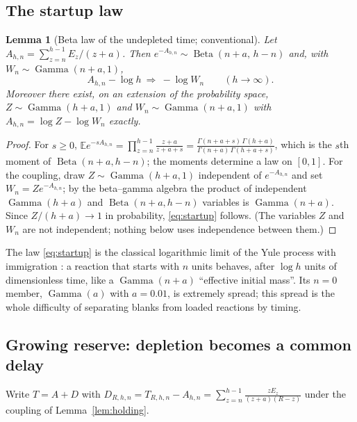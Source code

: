 \documentclass[11pt,a4paper]{article}
\theoremstyle{plain}
\newtheorem{lemma}[theorem]{Lemma}
\theoremstyle{definition}
\theoremstyle{remark}
\newcommand{\E}{\mathbb E}
\DeclareMathOperator{\Gam}{Gamma}
\DeclareMathOperator{\Bet}{Beta}
\begin{document}
\subsection{The startup law}
\begin{lemma}[Beta law of the undepleted time; conventional]\label{lem:beta}
Let $A_{h,n}=\sum_{z=n}^{h-1}E_z/(z+a)$. Then $e^{-A_{h,n}}\sim\Bet(n+a,\,h-n)$ and, with $W_n\sim\Gam(n+a,1)$,
\begin{equation}\label{eq:startup}
A_{h,n}-\log h\ \Rightarrow\ -\log W_n\qquad(h\to\infty).
\end{equation}
Moreover there exist, on an extension of the probability space, $Z\sim\Gam(h+a,1)$ and $W_n\sim\Gam(n+a,1)$ with $A_{h,n}=\log Z-\log W_n$ exactly.
\end{lemma}
\begin{proof}
For $s\ge0$, $\E e^{-sA_{h,n}}=\prod_{z=n}^{h-1}\frac{z+a}{z+a+s}=\frac{\Gamma(n+a+s)\,\Gamma(h+a)}{\Gamma(n+a)\,\Gamma(h+a+s)}$, which is the $s$th moment of $\Bet(n+a,h-n)$; the moments determine a law on $[0,1]$. For the coupling, draw $Z\sim\Gam(h+a,1)$ independent of $e^{-A_{h,n}}$ and set $W_n=Ze^{-A_{h,n}}$; by the beta--gamma algebra \citep{lukacs1955} the product of independent $\Gam(h+a)$ and $\Bet(n+a,h-n)$ variables is $\Gam(n+a)$. Since $Z/(h+a)\to1$ in probability, \eqref{eq:startup} follows. (The variables $Z$ and $W_n$ are not independent; nothing below uses independence between them.)
\end{proof}
The law \eqref{eq:startup} is the classical logarithmic limit of the Yule process with immigration \citep{kendall1948}: a reaction that starts with $n$ units behaves, after $\log h$ units of dimensionless time, like a $\Gam(n+a)$ ``effective initial mass''. Its $n=0$ member, $\Gam(a)$ with $a=0.01$, is extremely spread; this spread is the whole difficulty of separating blanks from loaded reactions by timing.

\subsection{Growing reserve: depletion becomes a common delay}
Write $T=A+D$ with $D_{R,h,n}=T_{R,h,n}-A_{h,n}=\sum_{z=n}^{h-1}\frac{zE_z}{(z+a)(R-z)}$ under the coupling of Lemma~\ref{lem:holding}.
\end{document}
